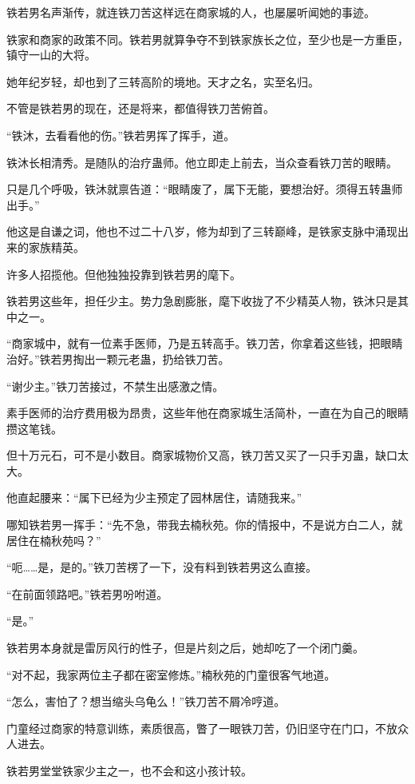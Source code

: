 \begin{this_body}
铁若男名声渐传，就连铁刀苦这样远在商家城的人，也屡屡听闻她的事迹。

铁家和商家的政策不同。铁若男就算争夺不到铁家族长之位，至少也是一方重臣，镇守一山的大将。

她年纪岁轻，却也到了三转高阶的境地。天才之名，实至名归。

不管是铁若男的现在，还是将来，都值得铁刀苦俯首。

“铁沐，去看看他的伤。”铁若男挥了挥手，道。

铁沐长相清秀。是随队的治疗蛊师。他立即走上前去，当众查看铁刀苦的眼睛。

只是几个呼吸，铁沐就禀告道：“眼睛废了，属下无能，要想治好。须得五转蛊师出手。”

他这是自谦之词，他也不过二十八岁，修为却到了三转巅峰，是铁家支脉中涌现出来的家族精英。

许多人招揽他。但他独独投靠到铁若男的麾下。

铁若男这些年，担任少主。势力急剧膨胀，麾下收拢了不少精英人物，铁沐只是其中之一。

“商家城中，就有一位素手医师，乃是五转高手。铁刀苦，你拿着这些钱，把眼睛治好。”铁若男掏出一颗元老蛊，扔给铁刀苦。

“谢少主。”铁刀苦接过，不禁生出感激之情。

素手医师的治疗费用极为昂贵，这些年他在商家城生活简朴，一直在为自己的眼睛攒这笔钱。

但十万元石，可不是小数目。商家城物价又高，铁刀苦又买了一只手刃蛊，缺口太大。

他直起腰来：“属下已经为少主预定了园林居住，请随我来。”

哪知铁若男一挥手：“先不急，带我去楠秋苑。你的情报中，不是说方白二人，就居住在楠秋苑吗？”

“呃……是，是的。”铁刀苦楞了一下，没有料到铁若男这么直接。

“在前面领路吧。”铁若男吩咐道。

“是。”

铁若男本身就是雷厉风行的性子，但是片刻之后，她却吃了一个闭门羹。

“对不起，我家两位主子都在密室修炼。”楠秋苑的门童很客气地道。

“怎么，害怕了？想当缩头乌龟么！”铁刀苦不屑冷哼道。

门童经过商家的特意训练，素质很高，瞥了一眼铁刀苦，仍旧坚守在门口，不放众人进去。

铁若男堂堂铁家少主之一，也不会和这小孩计较。


\end{this_body}
